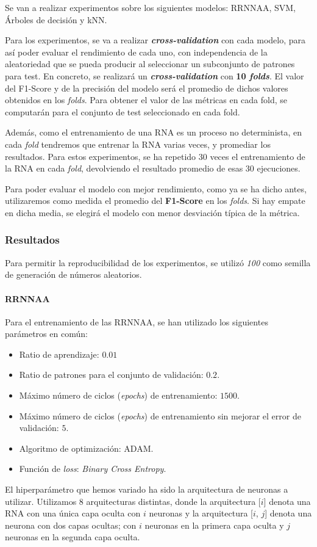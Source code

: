 \documentclass[12pt]{article}
\begin{document}
\bigskip
Se van a realizar experimentos sobre los siguientes modelos: RRNNAA, SVM, Árboles de decisión y kNN.

\bigskip
Para los experimentos, se va a realizar \textbf{\textit{cross-validation}} con cada modelo, para así poder evaluar el rendimiento
de cada uno, con independencia de la aleatoriedad que se pueda producir al seleccionar un subconjunto de patrones para test.
En concreto, se realizará un \textbf{\textit{cross-validation}} con \textbf{10 \textit{folds}}. El valor del F1-Score y de la precisión
del modelo será el promedio de dichos valores obtenidos en los \textit{folds}. Para obtener el valor de las métricas en cada fold, 
se computarán para el conjunto de test seleccionado en cada fold.

\bigskip
Además, como el entrenamiento de una RNA es un proceso no determinista, en cada \textit{fold}
tendremos que entrenar la RNA varias veces, y promediar los resultados. Para estos experimentos,
se ha repetido 30 veces el entrenamiento de la RNA en cada \textit{fold}, devolviendo el resultado promedio de esas 30 ejecuciones.

\bigskip
Para poder evaluar el modelo con mejor rendimiento, como ya se ha dicho antes, utilizaremos como medida el promedio
del \textbf{F1-Score} en los \textit{folds}. Si hay empate en dicha media, se elegirá el modelo con menor
desviación típica de la métrica.

\subsubsection{Resultados}
Para permitir la reproducibilidad de los experimentos, se utilizó \textit{100} como semilla de generación de números
aleatorios.

\paragraph{RRNNAA}

Para el entrenamiento de las RRNNAA, se han utilizado los siguientes parámetros en común:
\begin{itemize}
	\item Ratio de aprendizaje: $0.01$
	\item Ratio de patrones para el conjunto de validación: $0.2$.
	\item Máximo número de ciclos (\textit{epochs}) de entrenamiento: $1500$.
	\item Máximo número de ciclos (\textit{epochs}) de entrenamiento sin mejorar el error de validación: $5$.
	\item Algoritmo de optimización: ADAM.
	\item Función de \textit{loss}: \textit{Binary Cross Entropy}.
\end{itemize}
El hiperparámetro que hemos variado ha sido la arquitectura de neuronas a utilizar. Utilizamos 8 arquitecturas distintas,
donde la arquitectura [$i$] denota una RNA con una única capa oculta con $i$ neuronas y la arquitectura [$i$, $j$] 
denota una neurona con dos capas ocultas; con $i$ neuronas en la primera capa oculta y $j$ neuronas en la segunda capa oculta.
\end{document}
